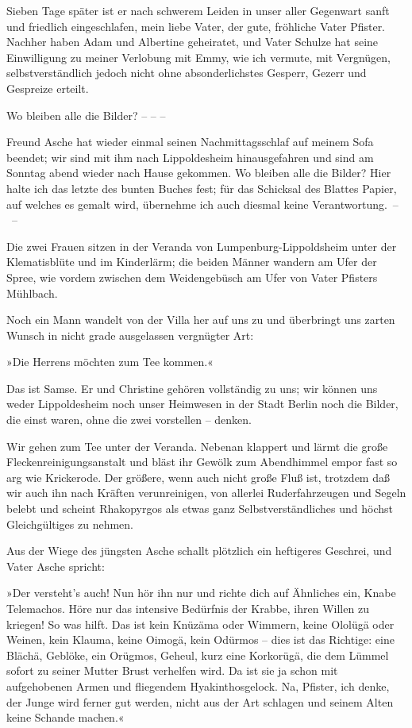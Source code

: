Sieben Tage später ist er nach schwerem Leiden in unser aller
Gegenwart sanft und friedlich eingeschlafen, mein liebe Vater, der
gute, fröhliche Vater Pfister. Nachher haben Adam und Albertine
geheiratet, und Vater Schulze hat seine Einwilligung zu meiner
Verlobung mit Emmy, wie ich vermute, mit Vergnügen,
selbstverständlich jedoch nicht ohne absonderlichstes Gesperr,
Gezerr und Gespreize erteilt.

Wo bleiben alle die Bilder? – – –

Freund Asche hat wieder einmal seinen Nachmittagsschlaf auf meinem
Sofa beendet; wir sind mit ihm nach Lippoldesheim hinausgefahren
und sind am Sonntag abend wieder nach Hause gekommen. Wo bleiben
alle die Bilder? Hier halte ich das letzte des bunten Buches fest;
für das Schicksal des Blattes Papier, auf welches es gemalt wird,
übernehme ich auch diesmal keine Verantwortung.~–~–

Die zwei Frauen sitzen in der Veranda von Lumpenburg-Lippoldsheim
unter der Klematisblüte und im Kinderlärm; die beiden Männer
wandern am Ufer der Spree, wie vordem zwischen dem Weidengebüsch am
Ufer von Vater Pfisters Mühlbach.

Noch ein Mann wandelt von der Villa her auf uns zu und überbringt
uns zarten Wunsch in nicht grade ausgelassen vergnügter Art:

»Die Herrens möchten zum Tee kommen.«

Das ist Samse. Er und Christine gehören vollständig zu uns; wir
können uns weder Lippoldesheim noch unser Heimwesen in der Stadt
Berlin noch die Bilder, die einst waren, ohne die zwei vorstellen –
denken.

Wir gehen zum Tee unter der Veranda. Nebenan klappert und lärmt die
große Fleckenreinigungsanstalt und bläst ihr Gewölk zum Abendhimmel
empor fast so arg wie Krickerode. Der größere, wenn auch nicht
große Fluß ist, trotzdem daß wir auch ihn nach Kräften
verunreinigen, von allerlei Ruderfahrzeugen und Segeln belebt und
scheint Rhakopyrgos als etwas ganz Selbstverständliches und höchst
Gleichgültiges zu nehmen.

Aus der Wiege des jüngsten Asche schallt plötzlich ein heftigeres
Geschrei, und Vater Asche spricht:

»Der versteht's auch! Nun hör ihn nur und richte dich auf Ähnliches
ein, Knabe Telemachos. Höre nur das intensive Bedürfnis der Krabbe,
ihren Willen zu kriegen! So was hilft. Das ist kein Knüzäma oder
Wimmern, keine Ololügä oder Weinen, kein Klauma, keine Oimogä, kein
Odürmos – dies ist das Richtige: eine Blächä, Geblöke, ein Orügmos,
Geheul, kurz eine Korkorügä, die dem Lümmel sofort zu seiner Mutter
Brust verhelfen wird. Da ist sie ja schon mit aufgehobenen Armen
und fliegendem Hyakinthosgelock. Na, Pfister, ich denke, der Junge
wird ferner gut werden, nicht aus der Art schlagen und seinem Alten
keine Schande machen.«

